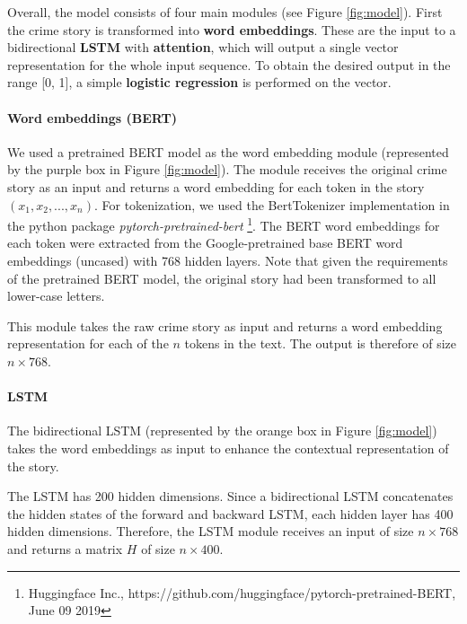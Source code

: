 \documentclass[11pt,a4paper]{article}
\begin{document}
Overall, the model consists of four main modules (see Figure \ref{fig:model}). First the crime story is transformed into \textbf{word embeddings}. These are the input to a bidirectional \textbf{LSTM} with \textbf{attention}, which will output a single vector representation for the whole input sequence. To obtain the desired output in the range [0, 1], a simple \textbf{logistic regression} is performed on the vector. 


\paragraph{Word embeddings (BERT)}
We used a pretrained BERT model as the word embedding module (represented by the purple box in Figure \ref{fig:model}). The module receives the original crime story as an input and returns a word embedding for each token in the story $(x_1, x_2, ..., x_n)$. For tokenization, we used the BertTokenizer implementation in the python package 
\textit{pytorch-pretrained-bert}
\footnote{Huggingface Inc., https:\slash \slash github.com\slash huggingface\slash pytorch-pretrained-BERT, June 09 2019}. 
The BERT word embeddings for each token were extracted from the Google-pretrained base BERT word embeddings (uncased) with 768 hidden layers. Note that given the requirements of the pretrained BERT model, the original story had been transformed to all lower-case letters.

This module takes the raw crime story as input and returns a word embedding representation for each of the $n$ tokens in the text. The output is therefore of size $n \times 768$.

\paragraph{LSTM}
The bidirectional LSTM (represented by the orange box in Figure \ref{fig:model}) takes the word embeddings as input to enhance the contextual representation of the story.

The LSTM has 200 hidden dimensions. Since a bidirectional LSTM concatenates the hidden states of the forward and backward LSTM, each hidden layer has 400 hidden dimensions. 
Therefore, the LSTM module receives an input of size $n \times 768$ and returns a matrix $H$ of size $n \times 400$.
\end{document}
